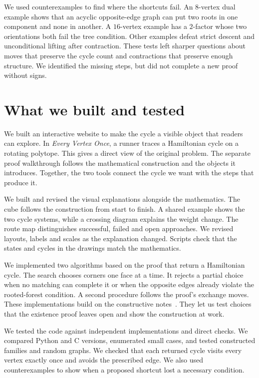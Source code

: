 \documentclass[11pt,a4paper]{article}
\begin{document}
We used counterexamples to find where the shortcuts fail. An $8$-vertex dual example shows that an acyclic opposite-edge graph can put two roots in one component and none in another. A $16$-vertex example has a $2$-factor whose two orientations both fail the tree condition. Other examples defeat strict descent and unconditional lifting after contraction. These tests left sharper questions about moves that preserve the cycle count and contractions that preserve enough structure. We identified the missing steps, but did not complete a new proof without signs.

\newpage
\section{What we built and tested}
We built an interactive website to make the cycle a visible object that readers can explore. In \emph{Every Vertex Once}, a runner traces a Hamiltonian cycle on a rotating polytope. This gives a direct view of the original problem. The separate proof walkthrough follows the mathematical construction and the objects it introduces. Together, the two tools connect the cycle we want with the steps that produce it.

We built and revised the visual explanations alongside the mathematics. The cube follows the construction from start to finish. A shared example shows the two cycle systems, while a crossing diagram explains the weight change. The route map distinguishes successful, failed and open approaches. We revised layouts, labels and scales as the explanation changed. Scripts check that the states and cycles in the drawings match the mathematics.

We implemented two algorithms based on the proof that return a Hamiltonian cycle. The search chooses corners one face at a time. It rejects a partial choice when no matching can complete it or when the opposite edges already violate the rooted-forest condition. A second procedure follows the proof's exchange moves. These implementations build on the constructive notes~\cite{Constructive}. They let us test choices that the existence proof leaves open and show the construction at work.

We tested the code against independent implementations and direct checks. We compared Python and C versions, enumerated small cases, and tested constructed families and random graphs. We checked that each returned cycle visits every vertex exactly once and avoids the prescribed edge. We also used counterexamples to show when a proposed shortcut lost a necessary condition.
\end{document}
